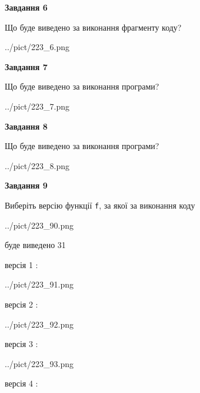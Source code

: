 \documentclass[12pt, ukrainian]{article}
\def\code#1{\Verb!#1!}
\begin{document}
{\begin {large}
{\begin {center}\textbf{Завдання 6}\end {center}}

Що буде виведено за виконання фрагменту коду?\par
\begin{center}
	{../pict/223_6.png}
\end{center}
\newpage

{\begin {center}\textbf{Завдання 7}\end {center}}

Що буде виведено за виконання програми?\par
\begin{center}
	{../pict/223_7.png}
\end{center}
\newpage

{\begin {center}\textbf{Завдання 8}\end {center}}

Що буде виведено за виконання програми?\par
\begin{center}
	{../pict/223_8.png}
\end{center}
\newpage

{\begin {center}\textbf{Завдання 9}\end {center}}

Виберіть версію функції \code{f}, за якої за виконання коду
\begin{center}
	{../pict/223_90.png}
\end{center}
буде виведено 31

\vspace{5mm}
версія 1 :

\begin{center}
	{../pict/223_91.png}
\end{center}
версія 2 :

\begin{center}
	{../pict/223_92.png}
\end{center}
версія 3 :

\begin{center}
	{../pict/223_93.png}
\end{center}
версія 4 :


\end{large}}
\end{document}
